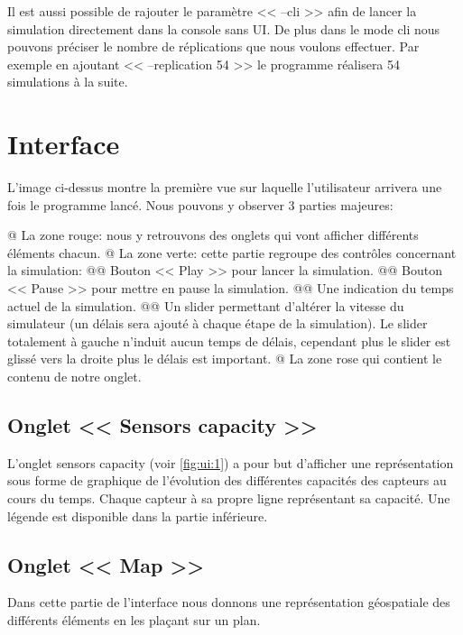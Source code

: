 \documentclass[final]{polytech/polytech}
\begin{document}
		Il est aussi possible de rajouter le paramètre << --cli >> afin de lancer la simulation directement dans la console sans UI.
		De plus dans le mode cli nous pouvons préciser le nombre de réplications que nous voulons effectuer. Par exemple en ajoutant << --replication 54 >> le programme réalisera 54 simulations à la suite. 
	
	\section{Interface}
		
		L'image ci-dessus montre la première vue sur laquelle l'utilisateur arrivera une fois le programme lancé.
		Nous pouvons y observer 3 parties majeures:
		\begin{easylist}
			@ La zone rouge: nous y retrouvons des onglets qui vont afficher différents éléments chacun.
			@ La zone verte: cette partie regroupe des contrôles concernant la simulation:
			@@ Bouton << Play >> pour lancer la simulation.
			@@ Bouton << Pause >> pour mettre en pause la simulation.
			@@ Une indication du temps actuel de la simulation.
			@@ Un slider permettant d'altérer la vitesse du simulateur (un délais sera ajouté à chaque étape de la simulation). Le slider totalement à gauche n'induit aucun temps de délais, cependant plus le slider est glissé vers la droite plus le délais est important.
			@ La zone rose qui contient le contenu de notre onglet.
		\end{easylist}
		
		\subsection{Onglet << Sensors capacity >>}
			L'onglet sensors capacity (voir \autoref{fig:ui:1}) a pour but d'afficher une représentation sous forme de graphique de l'évolution des différentes capacités des capteurs au cours du temps.
			Chaque capteur à sa propre ligne représentant sa capacité.
			Une légende est disponible dans la partie inférieure.
			
		\subsection{Onglet << Map >>}
			Dans cette partie de l'interface nous donnons une représentation géospatiale des différents éléments en les plaçant sur un plan.
			
			
\end{document}
